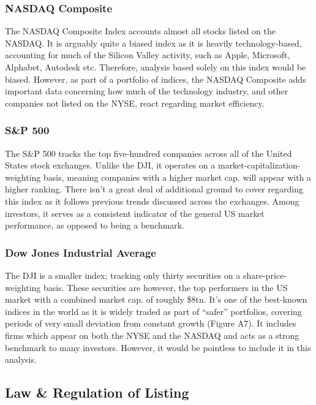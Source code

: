 \documentclass[11pt, english]{article}
\begin{document}
		\subsubsection{NASDAQ Composite}

		The NASDAQ Composite Index accounts almost all stocks listed on the NASDAQ. It is arguably quite a biased index as it is heavily technology-based, accounting for much of the Silicon Valley activity, such as Apple, Microsoft, Alphabet, Autodesk etc. Therefore, analysis based solely on this index would be biased. However, as part of a portfolio of indices, the NASDAQ Composite adds important data concerning how much of the technology industry, and other companies not listed on the NYSE, react regarding market efficiency.

		\subsubsection{S\&P 500}

		The S\&P 500 tracks the top five-hundred companies across all of the United States stock exchanges. Unlike the DJI, it operates on a market-capitalization-weighting basis, meaning companies with a higher market cap. will appear with a higher ranking. There isn’t a great deal of additional ground to cover regarding this index as it follows previous trends discussed across the exchanges. Among investors, it serves as a consistent indicator of the general US market performance, as opposed to being a benchmark.

		\subsubsection{Dow Jones Industrial Average}

		The DJI is a smaller index; tracking only thirty securities on a share-price-weighting basis. These securities are however, the top performers in the US market with a combined market cap. of roughly \$8tn. It’s one of the best-known indices in the world as it is widely traded as part of ``safer'' portfolios, covering periods of very small deviation from constant growth (Figure A7). It includes firms which appear on both the NYSE and the NASDAQ and acts as a strong benchmark to many investors. However, it would be pointless to include it in this analysis.

	\newpage

	\subsection{Law \& Regulation of Listing}
\end{document}
